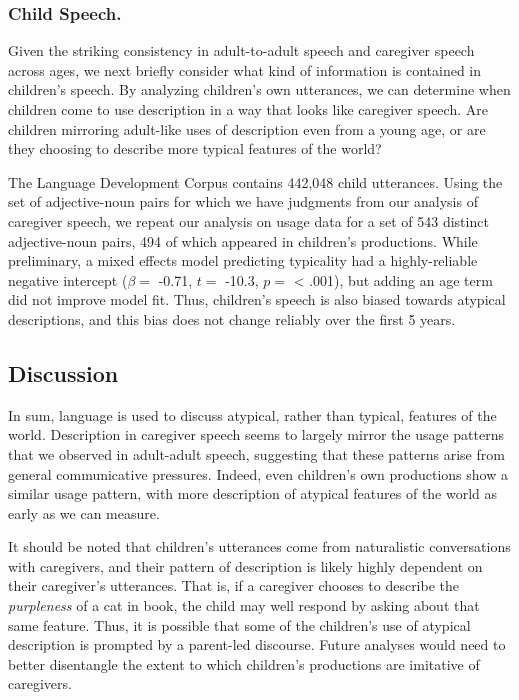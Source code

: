 \documentclass[10pt, letterpaper]{article}
\begin{document}
\hypertarget{child-speech.}{%
\subsubsection{Child Speech.}\label{child-speech.}}

Given the striking consistency in adult-to-adult speech and caregiver
speech across ages, we next briefly consider what kind of information is
contained in children's speech. By analyzing children's own utterances,
we can determine when children come to use description in a way that
looks like caregiver speech. Are children mirroring adult-like uses of
description even from a young age, or are they choosing to describe more
typical features of the world?

The Language Development Corpus contains 442,048 child utterances. Using
the set of adjective-noun pairs for which we have judgments from our
analysis of caregiver speech, we repeat our analysis on usage data for a
set of 543 distinct adjective-noun pairs, 494 of which appeared in
children's productions. While preliminary, a mixed effects model
predicting typicality had a highly-reliable negative intercept
(\(\beta =\) -0.71, \(t =\) -10.3, \(p =\) \textless{} .001), but adding
an age term did not improve model fit. Thus, children's speech is also
biased towards atypical descriptions, and this bias does not change
reliably over the first 5 years.

\hypertarget{discussion}{%
\subsection{Discussion}\label{discussion}}

In sum, language is used to discuss atypical, rather than typical,
features of the world. Description in caregiver speech seems to largely
mirror the usage patterns that we observed in adult-adult speech,
suggesting that these patterns arise from general communicative
pressures. Indeed, even children's own productions show a similar usage
pattern, with more description of atypical features of the world as
early as we can measure.

It should be noted that children's utterances come from naturalistic
conversations with caregivers, and their pattern of description is
likely highly dependent on their caregiver's utterances. That is, if a
caregiver chooses to describe the \emph{purpleness} of a cat in book,
the child may well respond by asking about that same feature. Thus, it
is possible that some of the children's use of atypical description is
prompted by a parent-led discourse. Future analyses would need to better
disentangle the extent to which children's productions are imitative of
caregivers.
\end{document}
